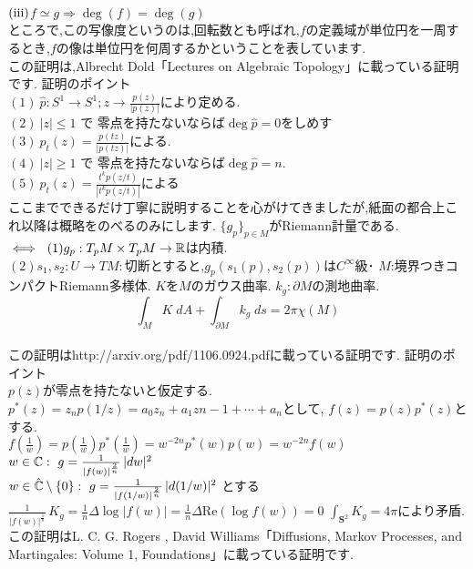 $\rm (iii)$$f \simeq g \Rightarrow \deg(f) = \deg(g)$\\
\propx
ところで,この写像度というのは,回転数とも呼ばれ,$f$の定義域が単位円を一周するとき,$f$の像は単位円を何周するかということを表しています.
\proof[代数トポロジー的な代数学の基本定理の証明]
\leavevmode\\
この証明は,Albrecht Dold「Lectures on Algebraic Topology」に載っている証明です.
証明のポイント\\
$(1) \ \hat{p}:S^1\to S^1 ; z \to \frac{p(z)}{|p(z)|}$により定める.\\
$(2)\ |z|\le 1$ で 零点を持たないならば$\deg \hat{p} = 0$をしめす\\
$(3)\ p_t(z) =  \frac{p(tz)}{|p(tz)|}$による.\\
$(4)\ |z|\ge 1$ で 零点を持たないならば$\deg \hat{p} = n$.\\
$(5)\ p_t(z) =  \frac{t^kp(z/t)}{|t^kp(z/t)|}$による\\
\proofx
ここまでできるだけ丁寧に説明することを心がけてきましたが,紙面の都合上これ以降は概略をのべるのみにします.
$\{g_p\}_{p\in M}$がRiemann計量である.\\
$\iff \ (1)g_p : T_p M \times T_p M \to \R $は内積.\\
$(2)s_1,s_2:U\to TM:$切断とすると,$g_p(s_1(p),s_2(p))$は$C^\infty$級･
\thm
$M$:境界つきコンパクトRiemann多様体. $K$を$M$のガウス曲率. $k_g:\partial M$の測地曲率.
\[
\int_M K\;dA+\int_{\partial M}k_g\;ds=2\pi\chi(M)
\]
\thmx
\proof[微分幾何学による代数学の基本定理の証明]
\leavevmode\\
この証明はhttp://arxiv.org/pdf/1106.0924.pdfに載っている証明です.
証明のポイント\\
$p(z)$が零点を持たないと仮定する.\\
$p^{*}(z) = z_np(1/z) = a_0z_n + a_1z{n-1} + \cdots + a_n$として, $f(z)=p(z)p^*(z)$とする.\\
$f(\tfrac{1}{w}) = p(\tfrac{1}{w})p^*(\tfrac{1}{w}) = w^{-2n}p^*(w)p(w) = w^{-2n}f(w)$\\
$w\in \C :\ g=\frac{1}{|f(w)|^{\frac{2}{n}}}\,|dw|^2$\\
$w\in \hat{\C} \setminus \{0\}:\  g=\frac{1}{|f(1/w)|^{\frac{2}{n}}}\,|d(1/w)|^2$ とする\\
$\frac{1}{|f(w)|^{\frac{1}{n}}}\,K_g=\frac{1}{n}\Delta \log|f(w)|=\frac{1}{n}\Delta \text{Re}(\log f(w))=0$
$\int_{\mathbf{S}^2}K_g=4\pi$により矛盾.
\proofx
{}
\proof[確率論による代数学の基本定理の証明]
この証明はL. C. G. Rogers , David Williams「Diffusions, Markov Processes, and Martingales: Volume 1, Foundations」に載っている証明です.
$$
